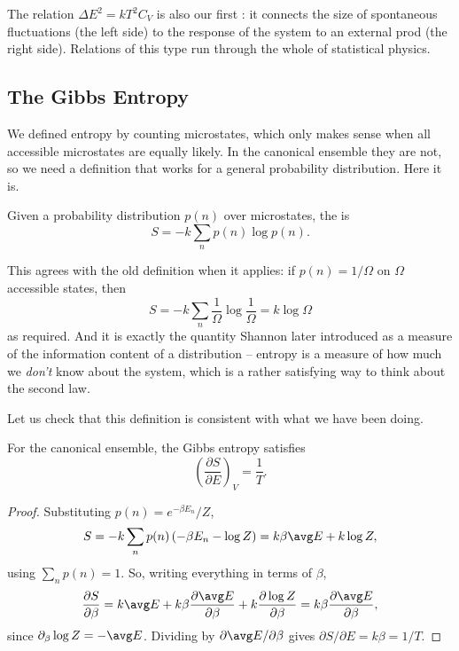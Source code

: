 The relation $\Delta E^2 = kT^2 C_V$ is also our first : it connects the size of spontaneous fluctuations (the left side) to the response of the system to an external prod (the right side). Relations of this type run through the whole of statistical physics.

\subsection{The Gibbs Entropy}

We defined entropy by counting microstates, which only makes sense when all accessible microstates are equally likely. In the canonical ensemble they are not, so we need a definition that works for a general probability distribution. Here it is.

\begin{definition}
	Given a probability distribution $p(n)$ over microstates, the  is
	$$
	S = -k \sum_n p(n) \log p(n).
	$$
\end{definition}

This agrees with the old definition when it applies: if $p(n) = 1/\Omega$ on $\Omega$ accessible states, then
$$
S = -k\sum_{n} \frac{1}{\Omega}\log\frac 1\Omega = k\log\Omega
$$
as required. And it is exactly the quantity Shannon later introduced as a measure of the information content of a distribution -- entropy is a measure of how much we \emph{don't} know about the system, which is a rather satisfying way to think about the second law.

Let us check that this definition is consistent with what we have been doing.

\begin{proposition}
	For the canonical ensemble, the Gibbs entropy satisfies
	$$
	\left(\frac{\partial S}{\partial E}\right)_V = \frac 1T.
	$$
\end{proposition}
\begin{proof}
	Substituting $p(n) = e^{-\beta E_n}/Z$,
	$$
	S = -k\sum_n p(n)\left(-\beta E_n - \log Z\right) = k\beta \avg E + k \log Z,
	$$
	using $\sum_n p(n) = 1$. So, writing everything in terms of $\beta$,
	$$
	\frac{\partial S}{\partial \beta} = k \avg E + k\beta \frac{\partial \avg E}{\partial \beta} + k \frac{\partial \log Z}{\partial\beta} = k\beta \frac{\partial \avg E}{\partial\beta},
	$$
	since $\partial_\beta \log Z = -\avg E$. Dividing by $\partial \avg E/\partial\beta$ gives $\partial S/\partial E = k\beta = 1/T$.
\end{proof}


